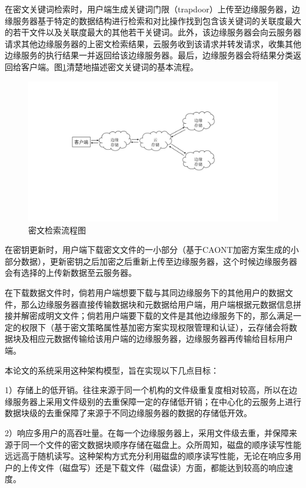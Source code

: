 \documentclass[promaster]{thesis-uestc}
\begin{document}
在密文关键词检索时，用户端生成关键词门限（trapdoor）上传至边缘服务器，边缘服务器基于特定的数据结构进行检索和对比操作找到包含该关键词的关联度最大的若干文件以及关联度最大的其他若干关键词。此外，该边缘服务器会向云服务器请求其他边缘服务器的上密文检索结果，云服务收到该请求并转发请求，收集其他边缘服务的执行结果一并返回给该边缘服务器。最后，边缘服务器会将结果分类返回给客户端。图\ref{密文检索流程图}清楚地描述密文关键词的基本流程。

\begin{figure}[htbp]  %
    \centering
    \includegraphics[width = 1.0\linewidth]{pic/miwenjiansuoliuchengtu.pdf}
    \caption{密文检索流程图}
    \label{密文检索流程图}
\end{figure}

在密钥更新时，用户端下载密文文件的一小部分（基于CAONT加密方案生成的小部分数据），更新密钥之后加密之后重新上传至边缘服务器，这个时候边缘服务器会有选择的上传新数据至云服务器。

在下载数据文件时，倘若用户端想要下载与其同边缘服务下的其他用户的数据文件，那么边缘服务器直接传输数据块和元数据给用户端，用户端根据元数据信息拼接并解密成明文文件；倘若用户端要下载的文件是其他边缘服务下的，那么满足一定的权限下（基于密文策略属性基加密方案实现权限管理和认证），云存储会将数据块及相应元数据传输给该用户端的边缘服务器，边缘服务器再传输给目标用户端。

本论文的系统采用这种架构模型，旨在实现以下几点目标：

1）存储上的低开销。往往来源于同一个机构的文件级重复度相对较高，所以在边缘服务器上采用文件级别的去重保障一定的存储低开销；在中心化的云服务上进行数据块级的去重保障了来源于不同边缘服务器的数据的存储低开效。

2）响应多用户的高吞吐量。在每一个边缘服务器上，采用文件级去重，并保障来源于同一个文件的密文数据块顺序存储在磁盘上。众所周知，磁盘的顺序读写性能远远高于随机读写。这种架构方式充分利用磁盘的顺序读写性能，无论在响应多用户的上传文件（磁盘写）还是下载文件（磁盘读）方面，都能达到较高的响应速度。
\end{document}

